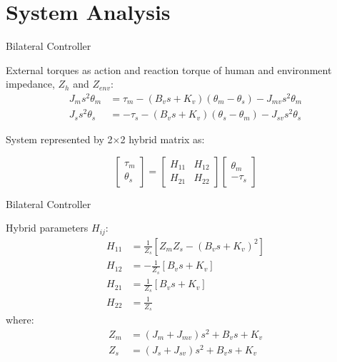 \documentclass[10pt]{beamer}
\begin{document}
\section{System Analysis}

\begin{frame}[fragile]{Bilateral Controller}

External torques as action and reaction torque of human and environment impedance, $ Z_{h} $ and $ Z_{env} $:
\begin{align*}
	J_m s^2 \theta_m &= \tau_m - (B_v s + K_v) (\theta_m - \theta_s) - J_{mv} s^2 \theta_m \\
	J_s s^2 \theta_s &= - \tau_s - (B_v s + K_v) (\theta_s - \theta_m) - J_{sv} s^2 \theta_s
\end{align*}

System represented by 2$\times $2 hybrid matrix as:

\begin{equation*}
\begin{bmatrix}
\tau_m \\ \theta_s
\end{bmatrix} = 
\begin{bmatrix}
H_{11} & H_{12} \\
H_{21} & H_{22}
\end{bmatrix}
\begin{bmatrix}
\theta_m \\ - \tau_s
\end{bmatrix}
\label{hybrid_matrix}
\end{equation*}

\end{frame}

\begin{frame}[fragile]{Bilateral Controller}

Hybrid parameters $ H_{ij} $:
\begin{align*}
	H_{11} &= \frac{1}{Z_s}[Z_m Z_s - (B_v s + K_v)^2] \\
	H_{12} &= -\frac{1}{Z_s}[B_v s + K_v] \\
	H_{21} &= \frac{1}{Z_s}[B_v s + K_v] \\
	H_{22} &= \frac{1}{Z_s} 
\end{align*}
where:
\begin{align*}
	Z_m &= (J_m + J_{mv}) s^2 + B_v s + K_v \\
	Z_s &= (J_s + J_{sv}) s^2 + B_v s + K_v
\end{align*}

\end{frame}
\end{document}
